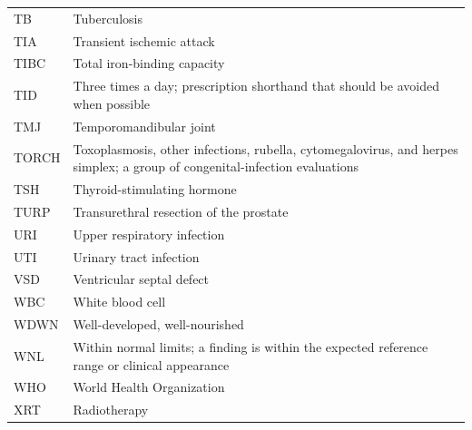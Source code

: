\begin{longtable}{>{\raggedright\arraybackslash}p{} >{\raggedright\arraybackslash}p{}}
TB & Tuberculosis \\
TIA & Transient ischemic attack \\
TIBC & Total iron-binding capacity \\
TID & Three times a day; prescription shorthand that should be avoided when possible \\
TMJ & Temporomandibular joint \\
TORCH & Toxoplasmosis, other infections, rubella, cytomegalovirus, and herpes simplex; a group of congenital-infection evaluations \\
TSH & Thyroid-stimulating hormone \\
TURP & Transurethral resection of the prostate \\
URI & Upper respiratory infection \\
UTI & Urinary tract infection \\
VSD & Ventricular septal defect \\
WBC & White blood cell \\
WDWN & Well-developed, well-nourished \\
WNL & Within normal limits; a finding is within the expected reference range or clinical appearance \\
WHO & World Health Organization \\
XRT & Radiotherapy \\
\end{longtable}
